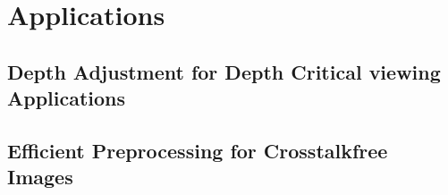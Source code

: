 \chapter{Applications}
\label{chap:applicatons}

\section{Depth Adjustment for Depth Critical viewing Applications}

\section{Efficient Preprocessing for Crosstalkfree Images}